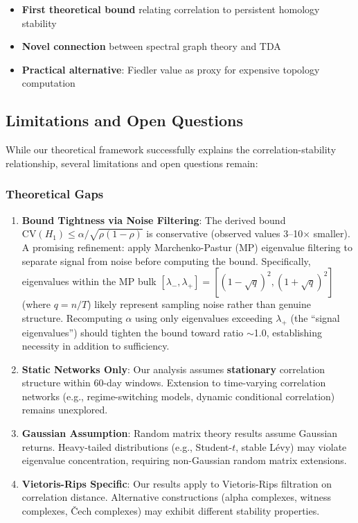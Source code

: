 \begin{itemize}
\item \textbf{First theoretical bound} relating correlation to persistent homology stability
\item \textbf{Novel connection} between spectral graph theory and TDA
\item \textbf{Practical alternative}: Fiedler value as proxy for expensive topology computation
\end{itemize}

\subsection{Limitations and Open Questions}
\label{sec:theory-limitations}

While our theoretical framework successfully explains the correlation-stability relationship, several limitations and open questions remain:

\subsubsection{Theoretical Gaps}

\begin{enumerate}
\item \textbf{Bound Tightness via Noise Filtering}: The derived bound $\text{CV}(H_1) \leq \alpha/\sqrt{\rho(1-\rho)}$ is conservative (observed values 3--10$\times$ smaller). A promising refinement: apply Marchenko-Pastur (MP) eigenvalue filtering to separate signal from noise before computing the bound. Specifically, eigenvalues within the MP bulk $[\lambda_-, \lambda_+] = [(1-\sqrt{q})^2, (1+\sqrt{q})^2]$ (where $q = n/T$) likely represent sampling noise rather than genuine structure. Recomputing $\alpha$ using only eigenvalues exceeding $\lambda_+$ (the ``signal eigenvalues'') should tighten the bound toward ratio $\sim$1.0, establishing necessity in addition to sufficiency.

\item \textbf{Static Networks Only}: Our analysis assumes \textbf{stationary} correlation structure within 60-day windows. Extension to time-varying correlation networks (e.g., regime-switching models, dynamic conditional correlation) remains unexplored.

\item \textbf{Gaussian Assumption}: Random matrix theory results assume Gaussian returns. Heavy-tailed distributions (e.g., Student-$t$, stable Lévy) may violate eigenvalue concentration, requiring non-Gaussian random matrix extensions.

\item \textbf{Vietoris-Rips Specific}: Our results apply to Vietoris-Rips filtration on correlation distance. Alternative constructions (alpha complexes, witness complexes, Čech complexes) may exhibit different stability properties.
\end{enumerate}

